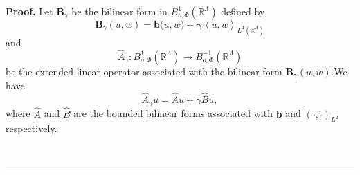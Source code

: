 \documentclass{article}
\newenvironment{proof}[1][Proof]{\noindent\textbf{#1.} }{\ \rule{0.5em}{0.5em}}
\begin{document}
\begin{proof}
Let $\mathbf{B}_{\gamma }$ be the bilinear form in $B_{o,\Phi }^{1}(\mathbb{R%
}^{\Lambda })$ defined by\ 
\begin{equation*}
\mathbf{B}_{\gamma }(u,w)=\mathbf{b(}u,w\mathbf{)+\gamma }\left\langle
u,w\right\rangle _{L^{2}(\mathbb{R}^{\Lambda })}
\end{equation*}%
and%
\begin{equation*}
\hat{A}_{\gamma }:B_{o,\Phi }^{1}(\mathbb{R}^{\Lambda })\rightarrow
B_{o,\Phi }^{-1}(\mathbb{R}^{\Lambda })
\end{equation*}%
be the extended linear operator associated with the bilinear form $\mathbf{B}%
_{\gamma }(u,w).$We have 
\begin{equation}
\hat{A}_{\gamma }u=\hat{A}u+\gamma \hat{B}u,
\end{equation}%
where $\hat{A}$ and $\hat{B}$ are the bounded bilinear forms associated with 
$\mathbf{b}$ and $\left( \cdot ,\cdot \right) _{L^{2}}$ respectively.


\end{proof}
\end{document}
